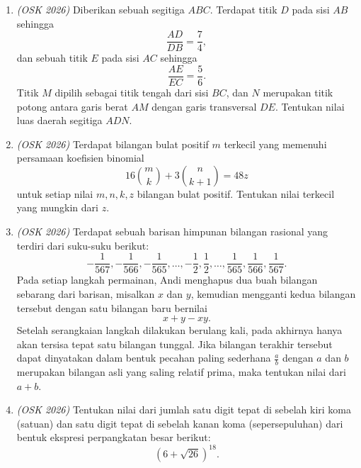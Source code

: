 \begin{enumerate}
	\item \textit{(OSK 2026)} Diberikan sebuah segitiga $ABC$. Terdapat titik $D$ pada sisi $AB$ sehingga
	\[
	\frac{AD}{DB}=\frac{7}{4},
	\]
	dan sebuah titik $E$ pada sisi $AC$ sehingga
	\[
	\frac{AE}{EC}=\frac{5}{6}.
	\]
	Titik $M$ dipilih sebagai titik tengah dari sisi $BC$, dan $N$ merupakan titik potong antara garis berat $AM$ dengan garis transversal $DE$. Tentukan nilai luas daerah segitiga $ADN$.
	
	\item \textit{(OSK 2026)} Terdapat bilangan bulat positif $m$ terkecil yang memenuhi persamaan koefisien binomial
	\[
	16\binom{m}{k}+3\binom{n}{k+1}=48z
	\]
	untuk setiap nilai $m,n,k,z$ bilangan bulat positif. Tentukan nilai terkecil yang mungkin dari $z$.
	
	\item \textit{(OSK 2026)} Terdapat sebuah barisan himpunan bilangan rasional yang terdiri dari suku-suku berikut:
	\[
	-\frac1{567},-\frac1{566},-\frac1{565},\ldots,-\frac12,\frac12,\ldots,\frac1{565},\frac1{566},\frac1{567}.
	\]
	Pada setiap langkah permainan, Andi menghapus dua buah bilangan sebarang dari barisan, misalkan $x$ dan $y$, kemudian mengganti kedua bilangan tersebut dengan satu bilangan baru bernilai
	\[
	x+y-xy.
	\]
	Setelah serangkaian langkah dilakukan berulang kali, pada akhirnya hanya akan tersisa tepat satu bilangan tunggal. Jika bilangan terakhir tersebut dapat dinyatakan dalam bentuk pecahan paling sederhana $\frac{a}{b}$ dengan $a$ dan $b$ merupakan bilangan asli yang saling relatif prima, maka tentukan nilai dari $a+b$.
	
	\item \textit{(OSK 2026)} Tentukan nilai dari jumlah satu digit tepat di sebelah kiri koma (satuan) dan satu digit tepat di sebelah kanan koma (sepersepuluhan) dari bentuk ekspresi perpangkatan besar berikut:
	\[
	(6+\sqrt{26})^{18}.
	\]
\end{enumerate}

